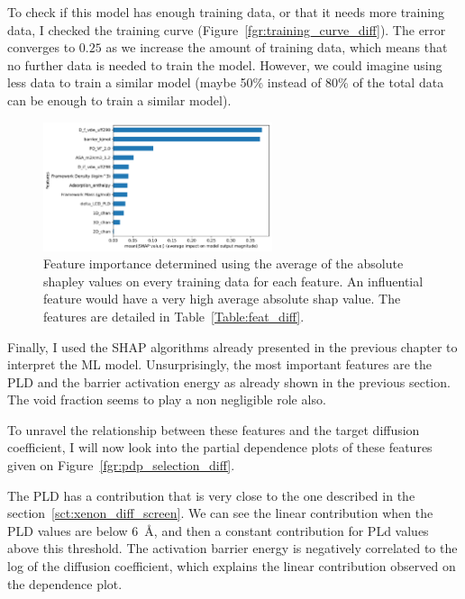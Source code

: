 \documentclass[main]{subfiles}
\begin{document}
To check if this model has enough training data, or that it needs more training data, I checked the training curve (Figure~\ref{fgr:training_curve_diff}). The error converges to $0.25$ as we increase the amount of training data, which means that no further data is needed to train the model. However, we could imagine using less data to train a similar model (maybe 50\% instead of 80\% of the total data can be enough to train a similar model). 

\begin{figure}[ht]
  \centering
  \includegraphics[width=0.6\textwidth]{figures/5-diffusion/Diff_Feature_importance_shapbased.pdf}
  \caption{ Feature importance determined using the average of the absolute shapley values on every training data for each feature. An influential feature would have a very high average absolute shap value. The features are detailed in Table~\ref{Table:feat_diff}. }\label{fgr:feat_imp_diff}
\end{figure}

Finally, I used the SHAP algorithms already presented in the previous chapter to interpret the ML model. Unsurprisingly, the most important features are the PLD and the barrier activation energy as already shown in the previous section. The void fraction seems to play a non negligible role also.

To unravel the relationship between these features and the target diffusion coefficient, I will now look into the partial dependence plots of these features given on Figure~\ref{fgr:pdp_selection_diff}. 

The PLD has a contribution that is very close to the one described in the section~\ref{sct:xenon_diff_screen}. We can see the linear contribution when the PLD values are below \SI{6}{\angstrom}, and then a constant contribution for PLd values above this threshold. The activation barrier energy is negatively correlated to the log of the diffusion coefficient, which explains the linear contribution observed on the dependence plot. 
\end{document}
